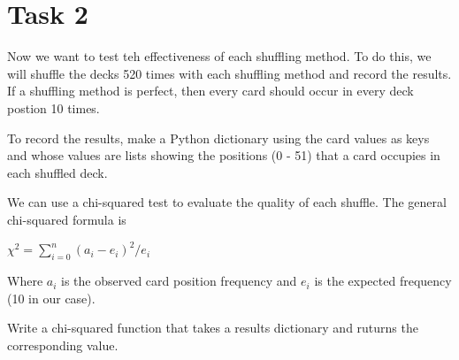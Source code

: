 \documentclass{article}
\begin{document}
\section{Task 2}
Now we want to test teh effectiveness of each shuffling method.  To do this,
we will shuffle the decks 520 times with each shuffling method and record the results.
If a shuffling method is perfect, then every card should occur in every deck postion
10 times.

To record the results, make a Python dictionary using the card values as keys and whose
values are lists showing the positions (0 - 51) that a card occupies in each shuffled deck.

We can use a chi-squared test to evaluate the quality of each shuffle.  The general 
chi-squared formula is

\vspace{5mm}
$\chi^2 = \sum_{i=0}^{n} (a_{i} - e_{i})^2/e_{i}$
\vspace{5mm}

Where $a_{i}$ is the observed card position frequency  and $e_{i}$ is the expected
frequency (10 in our case).

Write a chi-squared function that takes a results dictionary and ruturns the 
corresponding value.
\end{document}
